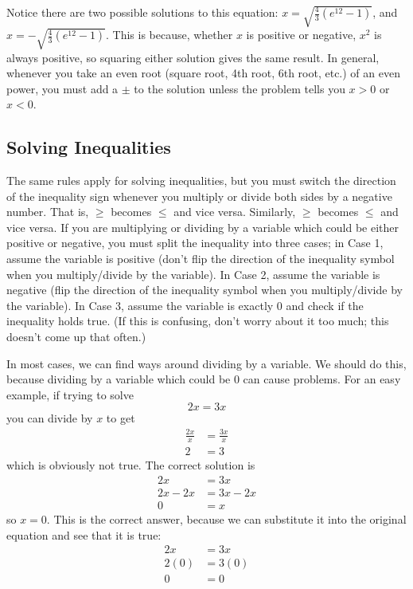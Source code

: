 Notice there are two possible solutions to this equation: $x = \sqrt{\frac{4}{3} (e^{12} - 1)}$, 
and $x = -\sqrt{\frac{4}{3} (e^{12} - 1)}$. This is because, whether $x$ is positive or negative, 
$x^2$ is always positive, so squaring either solution gives the same result. In general, whenever 
you take an even root (square root, 4th root, 6th root, etc.) of an even power, you must add a 
$\pm$ to the solution unless the problem tells you $x > 0$ or $x < 0$.

\subsection{Solving Inequalities}

The same rules apply for solving inequalities, but you must switch the direction of the inequality sign whenever you multiply or divide both sides by a negative number. That is, $\ge$ becomes $\le$ and vice versa. Similarly, $\geq$ 
becomes $\leq$ and vice versa. If you are multiplying or dividing by a variable which could be either positive or negative, you must split the inequality into three cases; in Case 1, assume the variable is positive (don't flip the direction 
of the inequality symbol when you multiply/divide by the variable). In Case 2, assume the variable is negative (flip the direction of the inequality symbol when you multiply/divide by the variable). In Case 3, assume the variable is exactly 0 
and check if the inequality holds true. (If this is confusing, don't worry about it too much; this doesn't come up that often.)

In most cases, we can find ways around dividing by a variable. We should do this, because dividing by a variable which could be 0 can cause problems. For an easy example, if trying to solve
\begin{equation*}
    2 x = 3x
\end{equation*}
you can divide by $x$ to get 
\begin{equation*}
    \begin{aligned}
        \frac{2 x}{x} & = \frac{3x}{x} \\ 
        2 & = 3
    \end{aligned}
\end{equation*}
which is obviously not true. The correct solution is
\begin{equation*}
    \begin{aligned}
        2x  & = 3x \\ 
        2x - 2x & = 3x - 2x \\ 
        0 & = x
    \end{aligned}
\end{equation*}
so $x = 0$. This is the correct answer, because we can substitute it into the original equation and see that it is true:
\begin{equation*}
    \begin{aligned}
        2x  & = 3x \\ 
        2(0)  & = 3(0) \\ 
        0 & = 0
    \end{aligned}
\end{equation*}